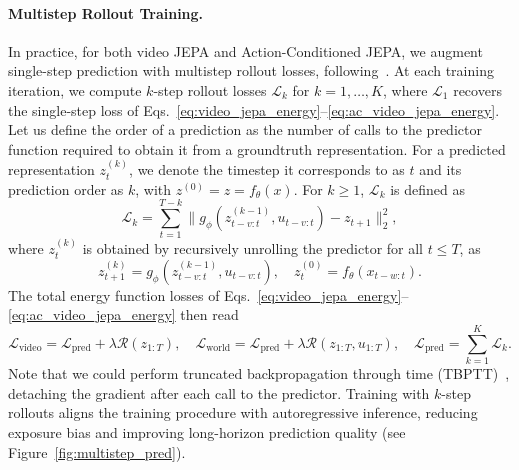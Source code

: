 \documentclass{article}
\begin{document}
\paragraph{Multistep Rollout Training.}
In practice, for both video JEPA and Action-Conditioned JEPA, we augment single-step prediction with multistep rollout losses, following~\citet{terver2026JEPAWMs,VJEPA2}.
At each training iteration, we compute $k$-step rollout losses $\mathcal{L}_k$ for $k = 1, \dots, K$, where $\mathcal{L}_1$ recovers the single-step loss of Eqs.~\eqref{eq:video_jepa_energy}--\eqref{eq:ac_video_jepa_energy}.
Let us define the order of a prediction as the number of calls to the predictor function required to obtain it from a groundtruth representation.
For a predicted representation $z^{(k)}_t$, we denote the timestep it corresponds to as $t$ and its prediction order as $k$, with $z^{(0)}=z=f_{\theta}(x)$.
For $k \geq 1$, $\mathcal{L}_k$ is defined as
\begin{equation}\label{eq:multistep_rollout_loss}
    \mathcal{L}_k = \sum_{t=1}^{T-k} \| g_\phi(z^{(k-1)}_{t-v:t}, u_{t-v:t}) - z_{t+1} \|_2^2,
\end{equation}
where $z^{(k)}_{t}$ is obtained by recursively unrolling the predictor for all $t\leq T$, as
\begin{equation}\label{eq:unroll}
    z^{(k)}_{t+1} = g_\phi(z^{(k-1)}_{t-v:t}, u_{t-v:t}), \quad z^{(0)}_{t}=f_{\theta}(x_{t-w:t}).
\end{equation}
The total energy function losses of Eqs.~\eqref{eq:video_jepa_energy}--\eqref{eq:ac_video_jepa_energy} then read
\begin{equation}
\mathcal{L}_{\text{video}} = \mathcal{L}_{{\text{pred}}} + \lambda \mathcal{R}(z_{1:T}), \quad \mathcal{L}_{\text{world}} = \mathcal{L}_{{\text{pred}}}+ \lambda \mathcal{R}(z_{1:T}, u_{1:T}), \quad \mathcal{L}_{{\text{pred}}}=\sum_{k=1}^{K} \mathcal{L}_k.
\label{eq:full_multistep_losses_video}
\end{equation}
Note that we could perform truncated backpropagation through time (TBPTT)~\citep{TBPTT2002tuto}, detaching the gradient after each call to the predictor.
Training with $k$-step rollouts aligns the training procedure with autoregressive inference, reducing exposure bias and improving long-horizon prediction quality (see Figure~\ref{fig:multistep_pred}).
\end{document}
